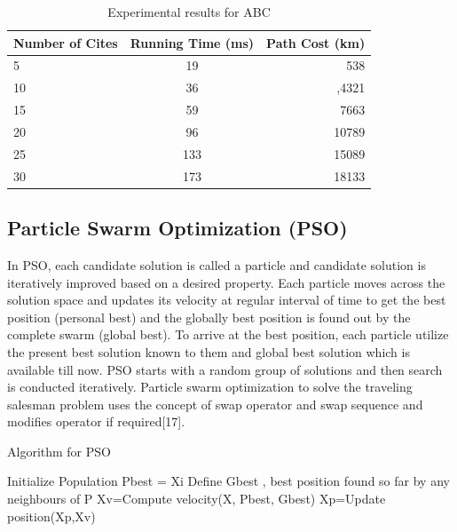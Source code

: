 \documentclass[conference]{IEEEtran}
\begin{document}
\begin{table}[h!]
  \begin{center}
    
    \begin{tabular}{l|c|r}
      \textbf{Number of Cites} & \textbf{Running Time (ms)} & \textbf{Path Cost (km)}\\
      \hline
      5 & 19 & 538\\
      10 & 36& ,4321\\
      15 & 59  & 7663\\
      20 & 96  & 10789\\ 
      25 & 133 & 15089\\
      30 & 173  & 18133\\
    \end{tabular}

    \caption{Experimental results for ABC}
  \end{center}
\end{table}


\subsection {Particle Swarm Optimization (PSO)}
In PSO, each candidate solution is called a particle and candidate solution is iteratively improved based on a desired property. Each particle moves across the solution space and  updates its velocity at regular interval of time to get the best position (personal best) and the globally best position is found out by the complete swarm (global best). To arrive at the best position, each particle utilize the present best solution known to them and global best solution which is available till now. PSO starts with a random group of solutions and then search is conducted iteratively. Particle swarm optimization to solve the traveling salesman problem uses the concept of swap operator and swap sequence and modifies operator if required[17]. 

\begin{algorithm}[H]
\caption{Algorithm for PSO}
\begin{algorithmic}[1]
\STATE Initialize Population
\REPEAT
{}
\STATE Pbest = Xi
\ENDIF
\ENDFOR 
\STATE Define Gbest , best position found so far by any neighbours of P
\STATE Xv=Compute velocity(X, Pbest, Gbest)
\STATE Xp=Update position(Xp,Xv)
\ENDFOR
{} 
\end{algorithmic}
\end{algorithm} 
\end{document}
